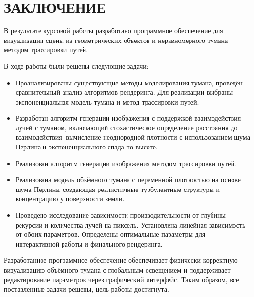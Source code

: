 \section*{ЗАКЛЮЧЕНИЕ}

В результате курсовой работы разработано программное обеспечение для визуализации сцены из геометрических объектов и неравномерного тумана методом трассировки путей.

В ходе работы были решены следующие задачи:

\begin{itemize}
    \item Проанализированы существующие методы моделирования тумана, проведён сравнительный анализ алгоритмов рендеринга. Для реализации выбраны экспоненциальная модель тумана и метод трассировки путей.
    \item Разработан алгоритм генерации изображения с поддержкой взаимодействия лучей с туманом, включающий стохастическое определение расстояния до взаимодействия, вычисление неоднородной плотности с использованием шума Перлина и экспоненциального спада по высоте.
    \item Реализован алгоритм генерации изображения методом трассировки путей.
    \item Реализована модель объёмного тумана с переменной плотностью на основе шума Перлина, создающая реалистичные турбулентные структуры и концентрацию у поверхности земли.
    \item Проведено исследование зависимости производительности от глубины рекурсии и количества лучей на пиксель. Установлена линейная зависимость от обоих параметров. Определены оптимальные параметры для интерактивной работы и финального рендеринга.
\end{itemize}

Разработанное программное обеспечение обеспечивает физически корректную визуализацию объёмного тумана с глобальным освещением и поддерживает редактирование параметров через графический интерфейс.
Таким образом, все поставленные задачи решены, цель работы достигнута.

\clearpage
